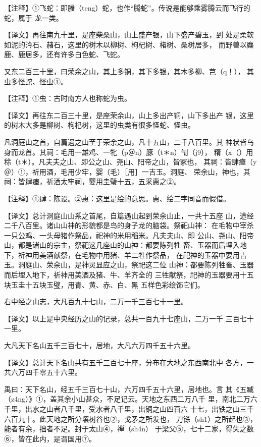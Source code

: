 \documentclass[a4paper,12pt,UTF8,twoside]{ctexbook}
\begin{document}
【注释】①飞蛇：即螣（teng）蛇，也作“腾蛇”。传说是能够乘雾腾云而飞行的蛇，属于 龙一类。

【译文】再往南九十里，是座柴桑山，山上盛产银，山下盛产碧玉，到 处是柔软如泥的汵石、赭石，这里的树木以柳树、枸杞树、楮树、桑树居多， 而野兽以麋鹿、鹿居多，还有许多白色蛇、飞蛇。

又东二百三十里，曰荣余之山，其上多铜，其下多银，其木多柳、芑（q！）， 其虫多怪蛇、怪虫①。

【注释】①虫：古时南方人也称蛇为虫。

【译文】再往东二百三十里，是座荣余山，山上多出产铜，山下多出产 银，这里的树木大多是柳树、枸杞树，这里的虫类有很多怪蛇、怪虫。

凡洞庭山之首，自篇遇之山至于荣余之山，凡十五山，二千八百里。其 神状皆鸟身而龙首。其祠：毛用一雄鸡、一牝（p＠n）豚（t＊n）刏（j9）， 糈（x（）用稌（t＊）。凡夫夫之山、即公之山、尧山、阳帝之山，皆冢也， 其祠：皆肆瘗（y＠）①，祈用酒，毛用少牢，婴（毛）［用］一吉玉。洞庭、 荣余山，神也，其祠：皆肆瘗，祈酒太牢祠，婴用圭璧十五，五采惠之②。

【注释】①肆：陈设。②惠：这里是绘的意思。惠、绘二字同音而假借。

【译文】总计洞庭山山系之首尾，自篇遇山起到荣余山止，一共十五座 山，途经二千八百里。诸山山神的形貌都是鸟的身子龙的脑袋。祭祀山神： 在毛物中宰杀一只公鸡、一头母猪作祭品，祀神的米用稻米。凡夫夫山、即 公山、尧山、阳帝山，都是诸山的宗主，祭祀这几座山的山神：都要陈列牲 畜、玉器而后埋入地下，祈神用美酒献祭，在毛物中用猪、羊二牲作祭品， 在祀神的玉器中要用吉玉。洞庭山、荣余山，是神灵显应之山，祭祀这二位 山神：都要陈列牲畜、玉器而后埋入地下，祈神用美酒及猪、牛、羊齐全的 三牲献祭，祀神的玉器要用十五块玉圭十五块玉璧，用青、黄、赤、白、黑 五样色彩绘饰它们。

右中经之山志，大凡百九十七山，二万一千三百七十一里。

【译文】以上是中央经历之山的记录，总共一百九十七座山，二万一千 三百七十一里。

大凡天下名山五千三百七十，居地，大凡六万四千五十六里。

【译文】总计天下名山共有五千三百七十座，分布在大地之东西南北中 各方，一共六万四千零五十六里。

禹曰：天下名山，经五千三百七十山，六万四千五十六里，居地也。言 其《五臧（z4ng）》①，盖其余小山甚众，不足记云。天地之东西二万八千 里，南北二万六千里，出水之山者八千里，受水者八千里，出铜之山四百六 十七，出铁之山三千六百九十。此天地之所分壤树谷也②，戈矛之所发也， 刀铩（sh1）之所起也③，能者有余，拙者不足。封于太山④，禅（sh4n） 于梁父⑤，七十二家，得失之数⑥，皆在此内，是谓国用⑦。
\end{document}
